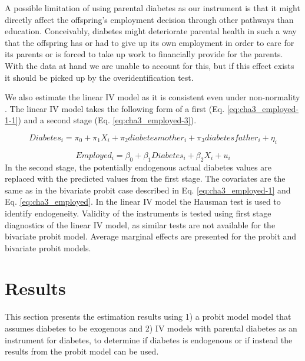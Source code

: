 A possible limitation of using parental diabetes as our
instrument is that it might directly affect the offspring's employment
decision through other pathways than education. Conceivably, diabetes
might deteriorate parental health in such a way that the offspring
has or had to give up its own employment in order to care for its
parents or is forced to take up work to financially provide for the
parents. With the data at hand we are unable to account for this,
but if this effect exists it should be picked up by the overidentification
test. 

We also estimate the linear \ac{IV} model
as it is consistent even under non-normality \parencite{Angrist2009a}.
The linear \ac{IV} model takes the following form of a first (Eq.
\ref{eq:cha3_employed-1-1}) and a second stage (Eq. \ref{eq:cha3_employed-3}).


\begin{equation}
Diabetes_{i}=\pi_{0}+\pi_{1}X_{i}+\pi_{2}diabetesmother_{i}+\pi_{3}diabetesfather_{i}+\eta_{i}\label{eq:cha3_employed-1-1}
\end{equation}



\begin{equation}
Employed_{i}=\beta_{0}+\beta_{1}Diabetes_{i}+\beta_{2}X_{i}+u_{i}\label{eq:cha3_employed-3}
\end{equation}
In the second stage, the potentially endogenous actual diabetes values
are replaced with the predicted values from the first stage. The covariates
are the same as in the bivariate probit case described in Eq.
\ref{eq:cha3_employed-1} and Eq. \ref{eq:cha3_employed}. In the linear \ac{IV}
model the Hausman test is used to identify endogeneity. Validity of
the instruments is tested using first stage diagnostics of the linear
\ac{IV} model, as similar tests are not available for the bivariate
probit model. Average marginal effects are presented for the probit and bivariate probit models. 


\section{\label{sec:RESULTS}Results}

This section presents the estimation results using 1) a
probit model model that assumes diabetes to be exogenous and 2) \ac{IV}
models with parental diabetes as an instrument for diabetes, to determine
if diabetes is endogenous or if instead the results from the probit
model can be used. 


